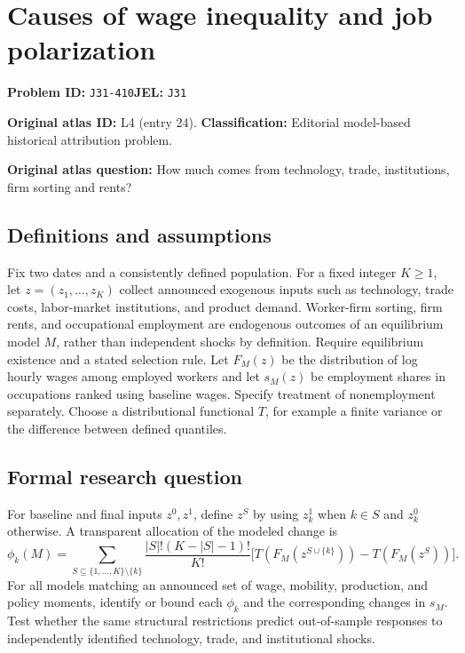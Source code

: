\documentclass[11pt,a4paper]{article}
\begin{document}
\section*{Causes of wage inequality and job polarization}
\textbf{Problem ID:} \texttt{J31-410}\quad \textbf{JEL:} \texttt{J31}\par
\label{problem:OP-0024}
\label{atlas:prob:L4}
\noindent\textbf{Original atlas ID:} L4 (entry 24). \textbf{Classification:} Editorial model-based historical attribution problem.

\noindent\textbf{Original atlas question:} How much comes from technology, trade, institutions, firm sorting and rents?

\subsection*{Definitions and assumptions}
Fix two dates and a consistently defined population. For a fixed integer $K\geq1$, let $z=(z_1,\ldots,z_K)$ collect announced exogenous inputs such as technology, trade costs, labor-market institutions, and product demand. Worker-firm sorting, firm rents, and occupational employment are endogenous outcomes of an equilibrium model $M$, rather than independent shocks by definition. Require equilibrium existence and a stated selection rule. Let $F_M(z)$ be the distribution of log hourly wages among employed workers and let $s_M(z)$ be employment shares in occupations ranked using baseline wages. Specify treatment of nonemployment separately. Choose a distributional functional $T$, for example a finite variance or the difference between defined quantiles.
\subsection*{Formal research question}
For baseline and final inputs $z^0,z^1$, define $z^S$ by using $z_k^1$ when $k\in S$ and $z_k^0$ otherwise. A transparent allocation of the modeled change is
\[
 \phi_k(M)=\sum_{S\subseteq\{1,\ldots,K\}\setminus\{k\}}
 \frac{|S|!(K-|S|-1)!}{K!}
 \bigl[T(F_M(z^{S\cup\{k\}}))-T(F_M(z^S))\bigr].
\]
For all models matching an announced set of wage, mobility, production, and policy moments, identify or bound each $\phi_k$ and the corresponding changes in $s_M$. Test whether the same structural restrictions predict out-of-sample responses to independently identified technology, trade, and institutional shocks.
\end{document}
